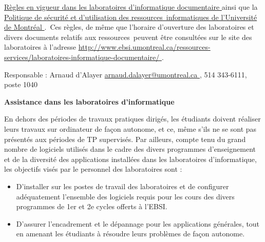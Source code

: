 \documentclass [12 pt]{article}
\begin{document}
        \href{
        http://www.ebsi.umontreal.ca/ressources-services/laboratoires-informatique-documentaire/EBSI-labo-info-politique-2013.pdf
        } {
        Règles en vigueur dans les laboratoires
                        d'informatique documentaire
        }
     ainsi que la 
        \href{
        http://secretariatgeneral.umontreal.ca/fileadmin/user_upload/secretariat/doc_officiels/reglements/administration/Ges40_28-politique-securite-informatique-utilisation-ressources-informatiques-universite-de-montreal.pdf
        } {
        Politique de sécurité et d'utilisation
                        des ressources informatiques de l'Université de
                    Montréal
        }
    . Ces règles, de même que l'horaire d'ouverture des
                laboratoires et divers documents relatifs aux ressources peuvent être
                consultées sur le site des laboratoires à l'adresse 
        \href{
        http://www.ebsi.umontreal.ca/ressources-services/laboratoires-informatique-documentaire/
        } {
        http://www.ebsi.umontreal.ca/ressources-services/laboratoires-informatique-documentaire/
        }
    .
            
                Responsable : Arnaud d'Alayer
        \href{
        mailto:arnaud.dalayer@umontreal.ca
        } {
        arnaud.dalayer@umontreal.ca
        }
    ,
                        514 343-6111, poste 1040
            
            
        \textbf{
        Assistance dans les laboratoires d'informatique
        }
    
            En dehors des périodes de travaux pratiques dirigés, les étudiants doivent réaliser
                leurs travaux sur ordinateur de façon autonome, et ce, même s'ils ne se sont pas
                présentés aux périodes de TP supervisés.
            Par ailleurs, compte tenu du grand nombre de logiciels utilisés dans le cadre des
                divers programmes d'enseignement et de la diversité des applications installées dans
                les laboratoires d'informatique, les objectifs visés par le personnel des
                laboratoires sont :
            
        \begin{itemize}
        
                
        \item D'installer sur les postes de travail des laboratoires et de configurer
                    adéquatement l'ensemble des logiciels requis pour les cours des divers
                    programmes de 1er et 2e cycles offerts à l'EBSI.
                
        \item D'assurer l'encadrement et le dépannage pour les applications générales, tout en
                    amenant les étudiants à résoudre leurs problèmes de façon autonome.
            
        \end{itemize}
    
\end{document}
